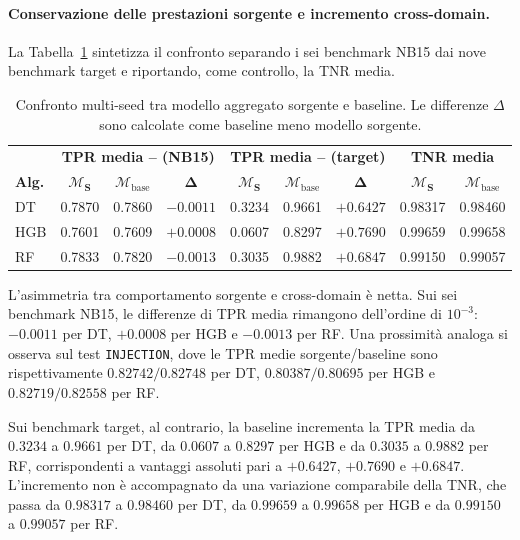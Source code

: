 \paragraph{Conservazione delle prestazioni sorgente e incremento cross-domain.}
La Tabella~\ref{tab:source_vs_base_summary_tpr} sintetizza il confronto separando i sei benchmark NB15 dai nove benchmark target e riportando, come controllo, la TNR media.

\begin{table}[H]
    \centering
    \small
    \caption{Confronto multi-seed tra modello aggregato sorgente e baseline. Le differenze $\Delta$ sono calcolate come baseline meno modello sorgente.}
    \label{tab:source_vs_base_summary_tpr}
    \begin{tabular}{lccc|ccc|cc}
        \toprule
        & \multicolumn{3}{c|}{\textbf{TPR media -- (NB15)}} & \multicolumn{3}{c|}{\textbf{TPR media -- (target)}} & \multicolumn{2}{c}{\textbf{TNR media}} \\
        \textbf{Alg.} & $\boldsymbol{\mathcal{M}_{S}}$ & $\boldsymbol{\mathcal{M}_{\mathrm{base}}}$ & $\boldsymbol{\Delta}$ & $\boldsymbol{\mathcal{M}_{S}}$ & $\boldsymbol{\mathcal{M}_{\mathrm{base}}}$ & $\boldsymbol{\Delta}$ & $\boldsymbol{\mathcal{M}_{S}}$ & $\boldsymbol{\mathcal{M}_{\mathrm{base}}}$ \\
        \midrule
        DT & 0.7870 & 0.7860 & $-0.0011$ & 0.3234 & 0.9661 & $+0.6427$ & 0.98317 & 0.98460 \\
        HGB & 0.7601 & 0.7609 & $+0.0008$ & 0.0607 & 0.8297 & $+0.7690$ & 0.99659 & 0.99658 \\
        RF & 0.7833 & 0.7820 & $-0.0013$ & 0.3035 & 0.9882 & $+0.6847$ & 0.99150 & 0.99057 \\
        \bottomrule
    \end{tabular}
\end{table}

L'asimmetria tra comportamento sorgente e cross-domain è netta. 
Sui sei benchmark NB15, le differenze di TPR media rimangono dell'ordine di $10^{-3}$: $-0.0011$ per DT, $+0.0008$ per HGB e $-0.0013$ per RF. 
Una prossimità analoga si osserva sul test \texttt{INJECTION}, dove le TPR medie sorgente/baseline sono rispettivamente $0.82742/0.82748$ per DT, $0.80387/0.80695$ per HGB e $0.82719/0.82558$ per RF.

Sui benchmark target, al contrario, la baseline incrementa la TPR media da $0.3234$ a $0.9661$ per DT, da $0.0607$ a $0.8297$ per HGB e da
$0.3035$ a $0.9882$ per RF, corrispondenti a vantaggi assoluti pari a $+0.6427$, $+0.7690$ e $+0.6847$. 
L'incremento non è accompagnato da una variazione comparabile della TNR, che passa da $0.98317$ a $0.98460$ per DT, da $0.99659$ a $0.99658$ per HGB e da $0.99150$ a $0.99057$ per RF.

